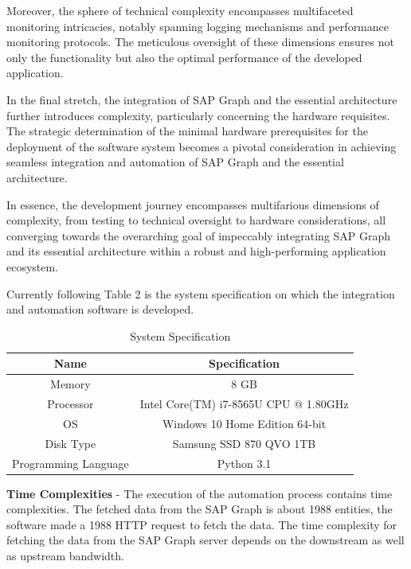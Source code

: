 \documentclass{article}
\begin{document}
Moreover, the sphere of technical complexity encompasses multifaceted monitoring intricacies, notably spanning logging mechanisms and performance monitoring protocols. The meticulous oversight of these dimensions ensures not only the functionality but also the optimal performance of the developed application.

In the final stretch, the integration of SAP Graph and the essential architecture further introduces complexity, particularly concerning the hardware requisites. The strategic determination of the minimal hardware prerequisites for the deployment of the software system becomes a pivotal consideration in achieving seamless integration and automation of SAP Graph and the essential architecture.

In essence, the development journey encompasses multifarious dimensions of complexity, from testing to technical oversight to hardware considerations, all converging towards the overarching goal of impeccably integrating SAP Graph and its essential architecture within a robust and high-performing application ecosystem.

Currently following Table 2 is the system specification on which the integration and automation software is developed.


\begin{table}[ht!]
\centering
\begin{adjustbox}{width=\columnwidth,center}
\begin{tabular}{|c|c|}
\hline
\textbf{Name} & \textbf{Specification} \\
\hline
Memory & 8 GB \\
\hline
Processor & Intel Core(TM) i7-8565U CPU @ 1.80GHz \\ 
\hline
OS & Windows 10 Home Edition 64-bit \\
\hline
Disk Type & Samsung SSD 870 QVO 1TB \\
\hline
Programming Language & Python 3.1 \\
\hline
\end{tabular}
\end{adjustbox}
\caption{System Specification}
\end{table}

\textbf{Time Complexities} - The execution of the automation process contains time complexities. The fetched data from the SAP Graph is about 1988 entities, the software made a 1988 HTTP request to fetch the data. The time complexity for fetching the data from the SAP Graph server depends on the downstream as well as upstream bandwidth. 
\end{document}
